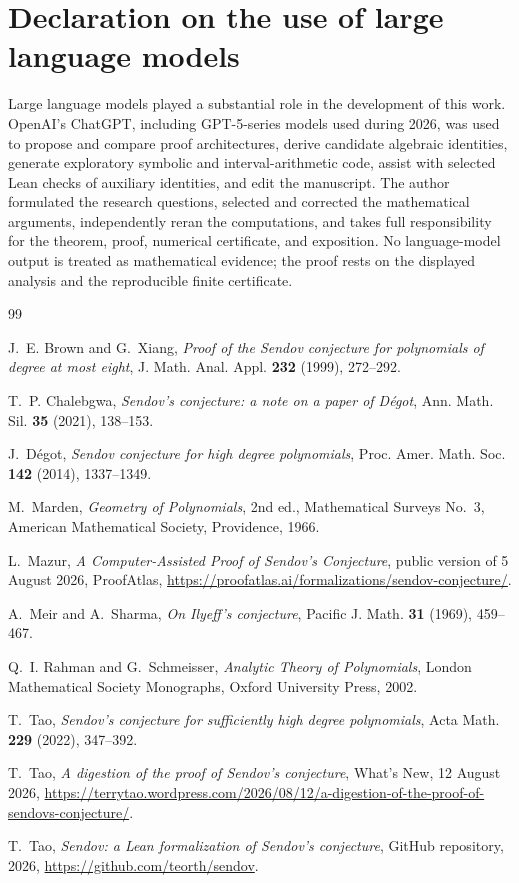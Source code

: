 \documentclass[11pt]{amsart}
\theoremstyle{definition}
\begin{document}
\section*{Declaration on the use of large language models}
Large language models played a substantial role in the development of this work.  OpenAI's ChatGPT, including GPT-5-series models used during 2026, was used to propose and compare proof architectures, derive candidate algebraic identities, generate exploratory symbolic and interval-arithmetic code, assist with selected Lean checks of auxiliary identities, and edit the manuscript.  The author formulated the research questions, selected and corrected the mathematical arguments, independently reran the computations, and takes full responsibility for the theorem, proof, numerical certificate, and exposition.  No language-model output is treated as mathematical evidence; the proof rests on the displayed analysis and the reproducible finite certificate.

\begin{thebibliography}{99}

J.~E. Brown and G.~Xiang,
\emph{Proof of the Sendov conjecture for polynomials of degree at most eight},
J. Math. Anal. Appl. \textbf{232} (1999), 272--292.

T.~P. Chalebgwa,
\emph{Sendov's conjecture: a note on a paper of D\'egot},
Ann. Math. Sil. \textbf{35} (2021), 138--153.

J.~D\'egot,
\emph{Sendov conjecture for high degree polynomials},
Proc. Amer. Math. Soc. \textbf{142} (2014), 1337--1349.

M.~Marden,
\emph{Geometry of Polynomials}, 2nd ed.,
Mathematical Surveys No.~3, American Mathematical Society, Providence, 1966.

L.~Mazur,
\emph{A Computer-Assisted Proof of Sendov's Conjecture},
public version of 5 August 2026, ProofAtlas,
\url{https://proofatlas.ai/formalizations/sendov-conjecture/}.

A.~Meir and A.~Sharma,
\emph{On Ilyeff's conjecture},
Pacific J. Math. \textbf{31} (1969), 459--467.

Q.~I. Rahman and G.~Schmeisser,
\emph{Analytic Theory of Polynomials},
London Mathematical Society Monographs, Oxford University Press, 2002.

T.~Tao,
\emph{Sendov's conjecture for sufficiently high degree polynomials},
Acta Math. \textbf{229} (2022), 347--392.

T.~Tao,
\emph{A digestion of the proof of Sendov's conjecture},
What's New, 12 August 2026,
\url{https://terrytao.wordpress.com/2026/08/12/a-digestion-of-the-proof-of-sendovs-conjecture/}.

T.~Tao,
\emph{Sendov: a Lean formalization of Sendov's conjecture},
GitHub repository, 2026,
\url{https://github.com/teorth/sendov}.

\end{thebibliography}
\end{document}

